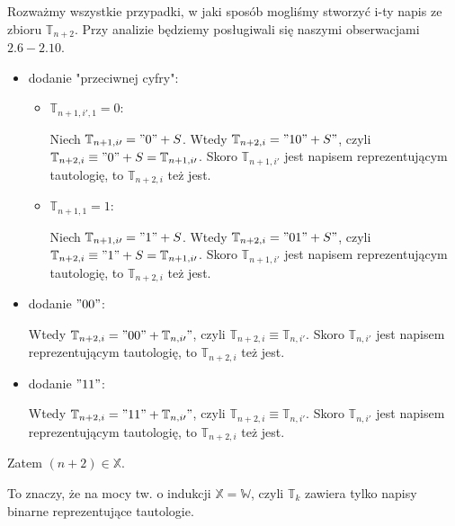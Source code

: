 \noindent
Rozważmy wszystkie przypadki, w jaki sposób mogliśmy stworzyć i-ty napis ze zbioru $\mathbb{T}_{n + 2}$. Przy analizie będziemy posługiwali się naszymi obserwacjami $2.6 - 2.10$.
\begin{itemize}
	\item dodanie "przeciwnej cyfry":
	\begin{itemize}
		\item $\mathbb{T}_{n + 1, i\prime, 1} = 0$:

		Niech $\mathbb{T}_{n + 1, i\prime} = "0" + S$. Wtedy $\mathbb{T}_{n + 2, i} = "10" + S"$, czyli $\mathbb{T}_{n + 2, i} \equiv "0" + S = \mathbb{T}_{n + 1, i\prime}$. Skoro $\mathbb{T}_{n + 1, i\prime}$ jest napisem reprezentującym tautologię, to $\mathbb{T}_{n + 2, i}$ też jest.

		\item $\mathbb{T}_{n + 1, 1} = 1$:

		Niech $\mathbb{T}_{n + 1, i\prime} = "1" + S$. Wtedy $\mathbb{T}_{n + 2, i} = "01" + S"$, czyli $\mathbb{T}_{n + 2, i} \equiv "1" + S = \mathbb{T}_{n + 1, i\prime}$. Skoro $\mathbb{T}_{n + 1, i\prime}$ jest napisem reprezentującym tautologię, to $\mathbb{T}_{n + 2, i}$ też jest.
	\end{itemize}
	\item dodanie $"00"$:

	Wtedy $\mathbb{T}_{n + 2, i} = "00" + \mathbb{T}_{n, i\prime}"$, czyli $\mathbb{T}_{n + 2, i} \equiv \mathbb{T}_{n, i\prime}$. Skoro $\mathbb{T}_{n, i\prime}$ jest napisem reprezentującym tautologię, to $\mathbb{T}_{n + 2, i}$ też jest.
	\item dodanie $"11"$:

	Wtedy $\mathbb{T}_{n + 2, i} = "11" + \mathbb{T}_{n, i\prime}"$, czyli $\mathbb{T}_{n + 2, i} \equiv \mathbb{T}_{n, i\prime}$. Skoro $\mathbb{T}_{n, i\prime}$ jest napisem reprezentującym tautologię, to $\mathbb{T}_{n + 2, i}$ też jest.
\end{itemize}

Zatem $(n + 2) \in \mathbb{X}$.
\n

\noindent
To znaczy, że na mocy tw. o indukcji $\mathbb{X} = \mathbb{W}$, czyli $\mathbb{T}_k$ zawiera tylko napisy binarne reprezentujące tautologie.